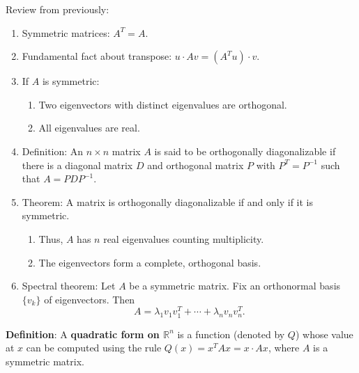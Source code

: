 \documentclass[12pt,letterpaper]{article}
\begin{document}
\thispagestyle{fancy}

Review from previously:

\begin{enumerate}
    \item Symmetric matrices: $A^T = A$.
    \item Fundamental fact about transpose: $u \cdot Av = (A^T u) \cdot v$.
    \item If $A$ is symmetric:
    \begin{enumerate}
        \item Two eigenvectors with distinct eigenvalues are orthogonal.
        \item All eigenvalues are real.
    \end{enumerate}
    \item Definition: An $n \times n$ matrix $A$ is said to be orthogonally diagonalizable if there is a diagonal matrix $D$ and orthogonal matrix $P$ with $P^T = P^{-1}$ such that $A = PDP^{-1}$.
    \item Theorem: A matrix is orthogonally diagonalizable if and only if it is symmetric.
    \begin{enumerate}
        \item Thus, $A$ has $n$ real eigenvalues counting multiplicity.
        \item The eigenvectors form a complete, orthogonal basis.
    \end{enumerate}
    \item Spectral theorem: Let $A$ be a symmetric matrix. Fix an orthonormal basis $\{v_k\}$ of eigenvectors. Then
    \[
    A = \lambda_1 v_1v_1^T + \cdots + \lambda_n v_nv_n^T.
    \]
\end{enumerate}

\textbf{Definition}:
A \textbf{quadratic form on $\mathbb{R}^n$} is a function (denoted by $Q$) whose value at $x$ can be computed using the rule $Q(x) = x^T A x = x \cdot A x$, where $A$ is a symmetric matrix.
\end{document}
